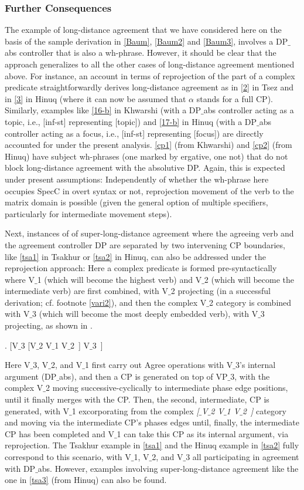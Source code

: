 \documentclass[output=paper
,modfonts
,nonflat]{langsci/langscibook}
\begin{document}
\subsubsection{Further Consequences}

The example of long-distance agreement that we have considered here on
the basis of the sample derivation in \ref{Baum}, \ref{Baum2} and
\ref{Baum3}, involves a DP$\_${abs} controller that is also a
wh-phrase. However, it should be clear that the approach generalizes
to all the other cases of long-distance agreement mentioned
above. For instance, an account in terms of reprojection of the part
of a complex predicate straightforwardly derives long-distance
agreement as in \ref{2} in Tsez and in \ref{3} in Hinuq (where it can
now be assumed that $\alpha$ stands for a full CP). Similarly,
examples like \ref{16-b} in Khwarshi (with a DP$\_${abs} controller
acting as a topic, i.e., [inf-st] representing [topic]) and \ref{17-b}
in Hinuq (with a DP$\_${abs} controller acting as a focus, i.e., [inf-st]
representing [focus]) are directly accounted for under the present
analysis. \ref{cp1} (from Khwarshi) and \ref{cp2} (from Hinuq) have
subject wh-phrases (one marked by ergative, one not) that do not block
long-distance agreement with the absolutive DP. Again, this is
expected under present assumptions: Independently of whether the
wh-phrase here occupies SpecC in overt syntax or not, reprojection
movement of the verb to the matrix domain is possible (given the
general option of multiple specifiers, particularly for intermediate
movement steps). 

Next, instances of of super-long-distance agreement where the
agreeing verb and the agreement controller DP are separated by two
intervening CP boundaries, like \ref{tsa1} in Tsakhur or \ref{tsa2} in
Hinuq, can also be addressed under the reprojection approach: Here a complex
predicate is formed pre-syntactically where V$\_$1 (which will become the
highest verb) and V$\_$2 (which will become the intermediate verb) are
first combined, with V$\_$2 projecting (in a successful derivation;
cf. footnote \ref{vari2}), and then the complex V$\_$2 category is
combined with V$\_$3 (which will become the most deeply embedded verb),
with V$\_$3 projecting, as shown in \Next.

\Lsciexi. [V$\_$3 [V$\_$2 V$\_$1 V$\_$2~] V$\_$3~]

Here V$\_$3, V$\_$2, and V$\_$1 first carry out Agree operations with V$\_$3's
internal argument (DP$\_${abs}), and then a CP is generated on top of
VP$\_$3, with the complex V$\_$2 moving successive-cyclically to
intermediate phase edge positions, until it finally merges with the
CP. Then, the second, intermediate, CP is generated, with V$\_$1
excorporating from the complex {\it [$\_${V$\_$2} V$\_$1 V$\_$2~]} category and
moving via the intermediate CP's phases edges until, finally, the
intermediate CP has been completed and V$\_$1 can take this CP as its
internal argument, via reprojection. The Tsakhur example in \ref{tsa1}
and the Hinuq example in \ref{tsa2} 
fully correspond to this scenario, with V$\_$1, V$\_$2, and V$\_$3 all
participating in agreement with DP$\_${abs}. However, examples
involving super-long-distance agreement like the one in 
\ref{tsa3} (from Hinuq) can also be found. 
\end{document}

